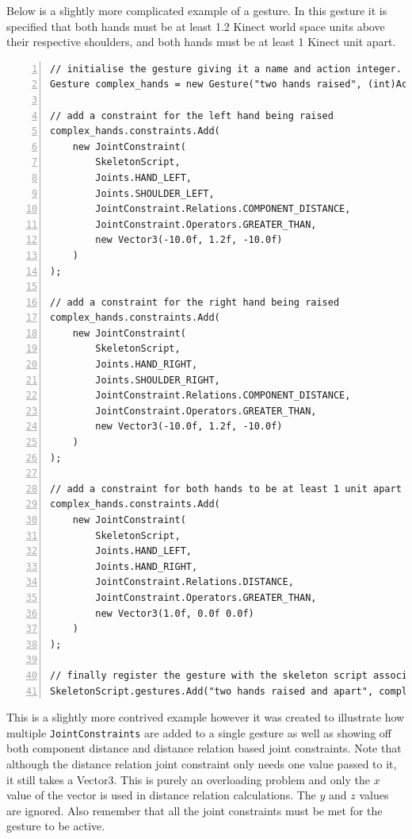 \documentclass[a4paper,oneside]{memoir}
\begin{document}
			Below is a slightly more complicated example of a gesture. In this gesture it is specified that both hands must be at least 1.2 Kinect world space units above their respective shoulders, and both hands must be at least 1 Kinect unit apart.

			\begin{lstlisting}[language=CSharp,numbers=left,morekeywords={Joints,JointConstraint,Gesture}]
// initialise the gesture giving it a name and action integer.
Gesture complex_hands = new Gesture("two hands raised", (int)ActionManager.actions.complexWave);

// add a constraint for the left hand being raised
complex_hands.constraints.Add(
	new JointConstraint(
		SkeletonScript,
		Joints.HAND_LEFT,
		Joints.SHOULDER_LEFT,
		JointConstraint.Relations.COMPONENT_DISTANCE,
		JointConstraint.Operators.GREATER_THAN,
		new Vector3(-10.0f, 1.2f, -10.0f)
	)
);

// add a constraint for the right hand being raised
complex_hands.constraints.Add(
	new JointConstraint(
		SkeletonScript,
		Joints.HAND_RIGHT,
		Joints.SHOULDER_RIGHT,
		JointConstraint.Relations.COMPONENT_DISTANCE,
		JointConstraint.Operators.GREATER_THAN,
		new Vector3(-10.0f, 1.2f, -10.0f)
	)
);

// add a constraint for both hands to be at least 1 unit apart
complex_hands.constraints.Add(
	new JointConstraint(
		SkeletonScript,
		Joints.HAND_LEFT,
		Joints.HAND_RIGHT,
		JointConstraint.Relations.DISTANCE,
		JointConstraint.Operators.GREATER_THAN,
		new Vector3(1.0f, 0.0f 0.0f)
	)
);

// finally register the gesture with the skeleton script associated with the player.
SkeletonScript.gestures.Add("two hands raised and apart", complex_hands);
			\end{lstlisting}

			This is a slightly more contrived example however it was created to illustrate how multiple \texttt{JointConstraints} are added to a single gesture as well as showing off both component distance and distance relation based joint constraints.
			Note that although the distance relation joint constraint only needs one value passed to it, it still takes a Vector3.
			This is purely an overloading problem and only the $x$ value of the vector is used in distance relation calculations.
			The $y$ and $z$ values are ignored.
			Also remember that all the joint constraints must be met for the gesture to be active.
\end{document}
